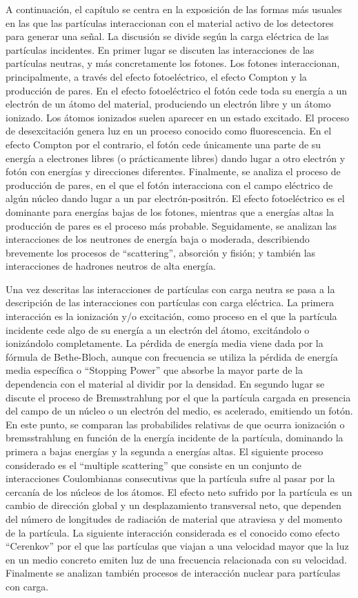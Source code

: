 A continuación, el capítulo se centra en la exposición de las formas más usuales en las que las partículas interaccionan con el material activo de los detectores para generar una señal. La discusión se divide según la carga eléctrica de las partículas incidentes. En primer lugar se discuten las interacciones de las partículas neutras, y más concretamente los fotones. Los fotones interaccionan, principalmente, a través del efecto fotoeléctrico, el efecto Compton y la producción de pares. En el efecto fotoeléctrico el fotón cede toda su energía a un electrón de un átomo del material, produciendo un electrón libre y un átomo ionizado. Los átomos ionizados suelen aparecer en un estado excitado. El proceso de desexcitación genera luz en un proceso conocido como fluorescencia. En el efecto Compton por el contrario, el fotón cede únicamente una parte de su energía a electrones libres (o prácticamente libres) dando lugar a otro electrón y fotón con energías y direcciones diferentes. Finalmente, se analiza el proceso de producción de pares, en el que el fotón interacciona con el campo eléctrico de algún núcleo dando lugar a un par electrón-positrón. El efecto fotoeléctrico es el dominante para energías bajas de los fotones, mientras que a energías altas la producción de pares es el proceso más probable. Seguidamente, se analizan las interacciones de los neutrones de energía baja o moderada, describiendo brevemente los procesos de ``scattering'', absorción y fisión; y también las interacciones de hadrones neutros de alta energía.

Una vez descritas las interacciones de partículas con carga neutra se pasa a la descripción de las interacciones con partículas con carga eléctrica. La primera interacción es la ionización y/o excitación, como proceso en el que la partícula incidente cede algo de su energía a un electrón del átomo, excitándolo o ionizándolo completamente. La pérdida de energía media viene dada por la fórmula de Bethe-Bloch, aunque con frecuencia se utiliza la pérdida de energía media específica o ``Stopping Power'' que absorbe la mayor parte de la dependencia con el material al dividir por la densidad. En segundo lugar se discute el proceso de Bremsstrahlung por el que la partícula cargada en presencia del campo de un núcleo o un electrón del medio, es acelerado, emitiendo un fotón. En este punto, se comparan las probabilides relativas de que ocurra ionización o bremsstrahlung en función de la energía incidente de la partícula, dominando la primera a bajas energías y la segunda a energías altas. El siguiente proceso considerado es el ``multiple scattering'' que consiste en un conjunto de interacciones Coulombianas consecutivas que la partícula sufre al pasar por la cercanía de los núcleos de los átomos. El efecto neto sufrido por la partícula es un cambio de dirección global y un desplazamiento transversal neto, que dependen del número de longitudes de radiación de material que atraviesa y del momento de la partícula. La siguiente interacción considerada es el conocido como efecto ``Cerenkov'' por el que las partículas que viajan a una velocidad mayor que la luz en un medio concreto emiten luz de una frecuencia relacionada con su velocidad. Finalmente se analizan también procesos de interacción nuclear para partículas con carga.

